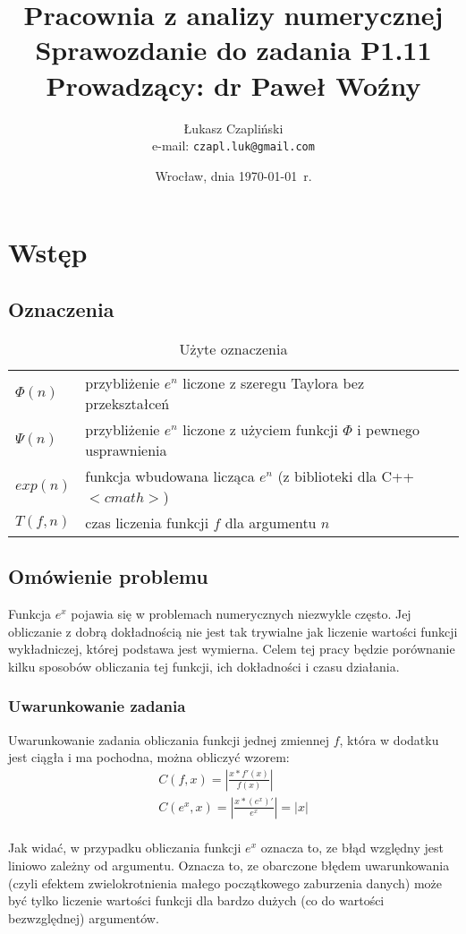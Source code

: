 \documentclass[11pt,wide]{mwart}
\title{{\textbf{Pracownia z analizy numerycznej\\}}
       {\Large Sprawozdanie do zadania \textbf{P1.11}\\}
       {\large Prowadzący: dr Paweł Woźny}}
\author{Łukasz Czapliński\\  e-mail: \texttt{czapl.luk@gmail.com}}
\date{Wrocław, dnia \today\ r.}
\begin{document}
\thispagestyle{empty}
\maketitle
\newpage
\section{Wstęp}
\subsection{Oznaczenia}
\begin{table}[h]
    \centering
    \begin{tabular}{l l}
        \hline
        $\Phi(n)$ & przybliżenie $e^n$ liczone z szeregu Taylora bez przekształceń\\
         $\Psi(n)$ & przybliżenie $e^n$ liczone z użyciem funkcji $\Phi$ i pewnego usprawnienia\\
        $exp(n)$  & funkcja wbudowana licząca $e^n$ (z biblioteki dla C++ $<cmath>$)\\
        $T(f,n)$  & czas liczenia funkcji $f$ dla argumentu $n$\\
        \hline
    \end{tabular}
    \caption{Użyte oznaczenia}
    \label{tab:oznaczenia}
\end{table}
\subsection{Omówienie problemu}
Funkcja $e^x$ pojawia się w problemach numerycznych niezwykle często. Jej obliczanie z dobrą dokładnością nie jest tak trywialne jak liczenie wartości funkcji wykładniczej, której podstawa jest wymierna. Celem tej pracy będzie porównanie kilku sposobów obliczania tej funkcji, ich dokładności i czasu działania.
\subsubsection{Uwarunkowanie zadania}
Uwarunkowanie zadania obliczania funkcji jednej zmiennej $f$, która w dodatku jest ciągła i ma pochodna, można obliczyć wzorem: \\
\begin{gather}
    C(f,x) = |\frac{x*f'(x)} { f(x)}|\\
    C(e^x, x) = |\frac{x*(e^x)'}{ e^x}| = |x|
\end{gather}\\
Jak widać, w przypadku obliczania funkcji $e^x$ oznacza to, ze błąd względny jest liniowo zależny od argumentu. Oznacza to, ze obarczone błędem uwarunkowania (czyli efektem zwielokrotnienia małego początkowego zaburzenia danych) może być tylko liczenie wartości funkcji dla bardzo dużych (co do wartości bezwzględnej) argumentów.
\end{document}
